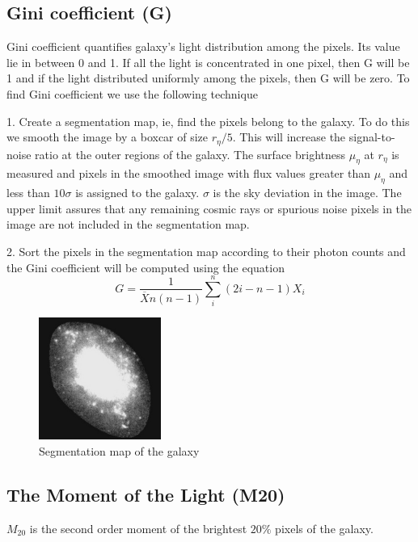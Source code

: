 \documentclass[a4paper,10pt]{article}
\begin{document}
\subsection{Gini coefficient (G)}
Gini coefficient quantifies galaxy's light distribution among the pixels. Its value lie in between 0 and 1. If all the light is concentrated in one pixel, then G will be 1 and if the light distributed uniformly among the pixels, then G will be zero. To find Gini coefficient we use the following technique

1. Create a segmentation map, ie, find the pixels belong to the galaxy. To do this we smooth the image by a boxcar of size $r_{\eta}/5$. This will increase the signal-to-noise ratio at the outer regions of the galaxy. The surface brightness $\mu_{\eta}$ at $r_{\eta}$ is measured and pixels in the smoothed image with flux values greater than $\mu_{\eta}$ and less than $10 \sigma$ is assigned to the galaxy. $\sigma$ is the sky deviation in the image. The upper limit assures that any remaining cosmic rays or spurious noise pixels in the image are not included in the segmentation map.

2. Sort the pixels in the segmentation map according to their photon counts and the Gini coefficient will be computed using the equation
\begin{equation}
G = \frac{1}{\overline{X} n (n-1)}\sum_{i}^n(2i-n-1)X_i
\end{equation}

\begin{figure}[h]
        \centering
        \includegraphics[width=4cm,height=4cm,bb=0 0 454 454]{segmentation.jpg}
        \caption{Segmentation map of the galaxy}
        \label{fig:9}
\end{figure}

\subsection{The Moment of the Light (M20)}
$M_{20}$ is the second order moment of the brightest $20\%$ pixels of the galaxy.
\end{document}
